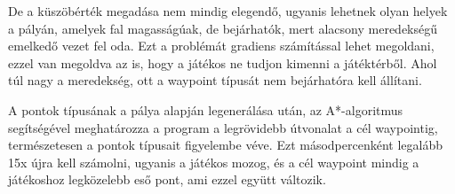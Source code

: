 
De a küszöbérték megadása nem mindig elegendő, ugyanis lehetnek olyan helyek a pályán, amelyek fal magasságúak, de bejárhatók, mert alacsony meredekségű emelkedő vezet fel oda. Ezt a problémát gradiens számítással lehet megoldani, ezzel van megoldva az is, hogy a játékos ne tudjon kimenni a játéktérből. Ahol túl nagy a meredekség, ott a waypoint típusát nem bejárhatóra kell állítani.

A pontok típusának a pálya alapján legenerálása után, az A*-algoritmus segítségével meghatározza a program a legrövidebb útvonalat a cél waypointig, természetesen a pontok típusait figyelembe véve. Ezt másodpercenként legalább 15x újra kell számolni, ugyanis a játékos mozog, és a cél waypoint mindig a játékoshoz legközelebb eső pont, ami ezzel együtt változik.

